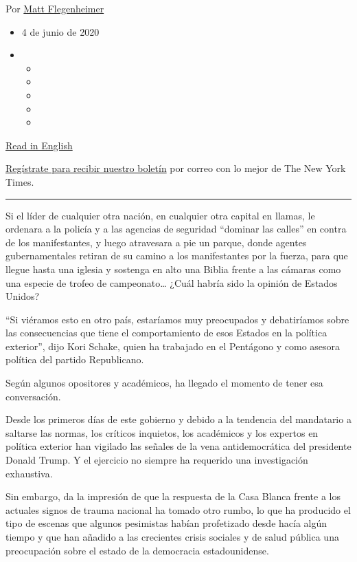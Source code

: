 Por \href{https://www.nytimes.com/by/matt-flegenheimer}{Matt
Flegenheimer}

\begin{itemize}
\item
  4 de junio de 2020
\item
  \begin{itemize}
  \item
  \item
  \item
  \item
  \item
  \end{itemize}
\end{itemize}

\href{https://www.nytimes.com/2020/06/02/us/politics/trump-holds-bible-photo.html}{Read
in English}

\href{https://www.nytimes.com/newsletters/el-times}{Regístrate para
recibir nuestro boletín} por correo con lo mejor de The New York Times.

\begin{center}\rule{0.5\linewidth}{\linethickness}\end{center}

Si el líder de cualquier otra nación, en cualquier otra capital en
llamas, le ordenara a la policía y a las agencias de seguridad ``dominar
las calles'' en contra de los manifestantes, y luego atravesara a pie un
parque, donde agentes gubernamentales retiran de su camino a los
manifestantes por la fuerza, para que llegue hasta una iglesia y
sostenga en alto una Biblia frente a las cámaras como una especie de
trofeo de campeonato\ldots{} ¿Cuál habría sido la opinión de Estados
Unidos?

``Si viéramos esto en otro país, estaríamos muy preocupados y
debatiríamos sobre las consecuencias que tiene el comportamiento de esos
Estados en la política exterior'', dijo Kori Schake, quien ha trabajado
en el Pentágono y como asesora política del partido Republicano.

Según algunos opositores y académicos, ha llegado el momento de tener
esa conversación.

Desde los primeros días de este gobierno y debido a la tendencia del
mandatario a saltarse las normas, los críticos inquietos, los académicos
y los expertos en política exterior han vigilado las señales de la vena
antidemocrática del presidente Donald Trump. Y el ejercicio no siempre
ha requerido una investigación exhaustiva.

Sin embargo, da la impresión de que la respuesta de la Casa Blanca
frente a los actuales signos de trauma nacional ha tomado otro rumbo, lo
que ha producido el tipo de escenas que algunos pesimistas habían
profetizado desde hacía algún tiempo y que han añadido a las crecientes
crisis sociales y de salud pública una preocupación sobre el estado de
la democracia estadounidense.

